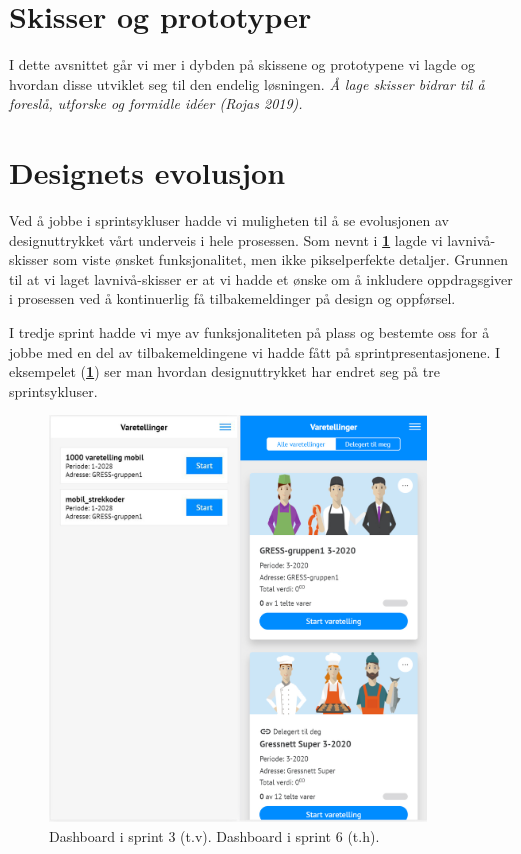 \section{\textbf{Skisser og prototyper}} \label{Skisser}
I dette avsnittet går vi mer i dybden på skissene og prototypene vi lagde og hvordan disse utviklet seg til den endelig løsningen. \textit{Å lage skisser bidrar til å foreslå, utforske og formidle idéer (Rojas 2019).}

\section{\textbf{Designets evolusjon}}
Ved å jobbe i sprintsykluser hadde vi muligheten til å se evolusjonen av designuttrykket vårt underveis i hele prosessen. Som nevnt i \textbf{\ref{Skisser}} lagde vi lavnivå-skisser som viste ønsket funksjonalitet, men ikke pikselperfekte detaljer. Grunnen til at vi laget lavnivå-skisser er at vi hadde et ønske om å inkludere oppdragsgiver i prosessen ved å kontinuerlig få tilbakemeldinger på design og oppførsel.

I tredje sprint hadde vi mye av funksjonaliteten på plass og bestemte oss for å jobbe med en del av tilbakemeldingene vi hadde fått på sprintpresentasjonene. I eksempelet (\textbf{\ref{fig:evolusjon_dashboard}}) ser man hvordan designuttrykket har endret seg på tre sprintsykluser. 

\begin{figure}[H] 
    \centering
    \includegraphics[width=100mm]{figures/Design-utforming/Evolusjon_dashboard.jpg}
    \caption{Dashboard i sprint 3 (t.v). Dashboard i sprint 6 (t.h).}
    \label{fig:evolusjon_dashboard}
\end{figure}

